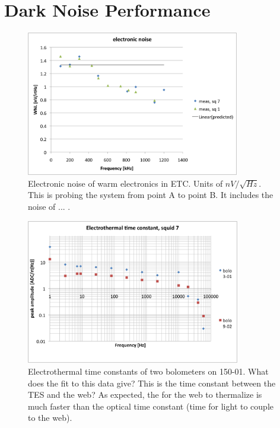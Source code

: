 

\section{Dark Noise Performance}
\label{sec:dark_nosie}


\begin{figure}[ht!]
\begin{center}
\includegraphics[height=2.5in]{figures/electronic_noise_sq1_sq7}
\caption{Electronic noise of warm electronics in \ac{ETC}. Units of $nV/\sqrt{Hz}$. This is probing the system from point A to point B. It includes the noise of ... .
\label{fig:dark_electronic_noise} }
\end{center}
\end{figure}

\begin{figure}[ht!]
\begin{center}
\includegraphics[height=2.5in]{figures/Nb01_squid7_etau_morepts}
\caption{Electrothermal time constants of two bolometers on 150-01. What does the fit to this data give? This is the time constant between the TES and the web? As expected, the for the web to thermalize is much faster than the optical time constant (time for light to couple to the web). 
\label{fig:electrothermal_tau} }
\end{center}
\end{figure}

